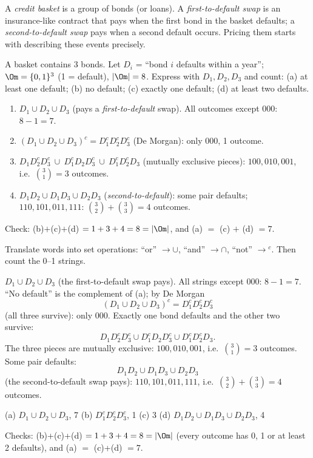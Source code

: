 
\begin{problem}
	\begin{context}
		A \emph{credit basket} is a group of bonds (or loans). A
		\emph{first-to-default swap} is an insurance-like contract that pays when
		the first bond in the basket defaults; a \emph{second-to-default swap} pays
		when a second default occurs. Pricing them starts with describing these
		events precisely.
	\end{context}
	A basket contains 3 bonds. Let $D_i$ = ``bond $i$ defaults within a
	year''; $\Om=\{0,1\}^3$ (1 = default), $|\Om|=8$. Express with
	$D_1,D_2,D_3$ and count: (a) at least one default; (b) no default;
	(c) exactly one default; (d) at least two defaults.
\end{problem}

\begin{slides}
	\small
	\exstatement
	\pause
	\sol
	\begin{enumerate}
		\item[(a)] $D_1\cup D_2\cup D_3$ \quad (pays a \emph{first-to-default}
		      swap). All outcomes except $000$: $8-1=7$.
		\item[(b)] $(D_1\cup D_2\cup D_3)^c = D_1^cD_2^cD_3^c$ \quad (De Morgan):
		      only $000$, 1 outcome.
		\item[(c)] $D_1D_2^cD_3^c\ \cup\ D_1^cD_2D_3^c\ \cup\ D_1^cD_2^cD_3$
		      \quad (mutually exclusive pieces): $100,010,001$, i.e.\
		      $\binom31=3$ outcomes.
		\item[(d)] $D_1D_2\cup D_1D_3\cup D_2D_3$ \quad (\emph{second-to-default}):
		      some pair defaults; $110,101,011,111$:
		      $\binom32+\binom33=4$ outcomes.
	\end{enumerate}
	Check: (b)$+$(c)$+$(d) $=1+3+4=8=|\Om|$, and (a) $=$ (c) $+$ (d) $=7$.
\end{slides}

\begin{solution}
	\idea Translate words into set operations: ``or'' $\to\cup$, ``and''
	$\to\cap$, ``not'' $\to{}^c$. Then count the 0--1 strings.

	 $D_1\cup D_2\cup D_3$ (the first-to-default swap pays). All
	strings except $000$: $8-1=7$.
	 ``No default'' is the complement of (a); by De Morgan
	\[ (D_1\cup D_2\cup D_3)^c=D_1^cD_2^cD_3^c \]
	(all three survive): only $000$.
	 Exactly one bond defaults and the other two survive:
	\[ D_1D_2^cD_3^c\cup D_1^cD_2D_3^c\cup D_1^cD_2^cD_3. \]
	The three pieces are
	mutually exclusive: $100,010,001$, i.e.\ $\binom31=3$ outcomes.
	 Some pair defaults:
	\[ D_1D_2\cup D_1D_3\cup D_2D_3 \]
	(the second-to-default swap pays): $110,101,011,111$, i.e.\
	$\binom32+\binom33=4$ outcomes.
	\begin{answer}
		(a) $D_1\cup D_2\cup D_3$, 7 \quad (b) $D_1^cD_2^cD_3^c$, 1 \quad
		(c) 3 \quad (d) $D_1D_2\cup D_1D_3\cup D_2D_3$, 4
	\end{answer}
	\begin{remark}
		Checks: (b)+(c)+(d) $=1+3+4=8=|\Om|$ (every outcome has 0, 1 or at least 2
		defaults), and (a) $=$ (c)+(d) $=7$.
	\end{remark}
\end{solution}
